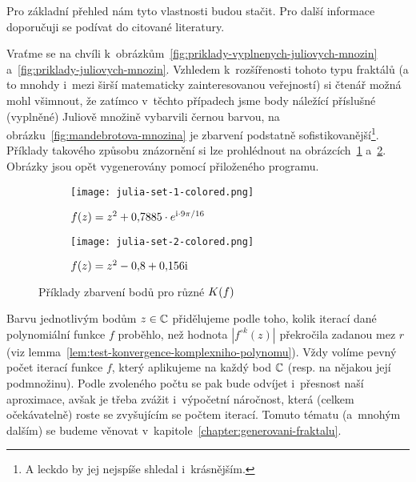 Pro základní přehled nám tyto vlastnosti budou stačit. Pro další informace doporučuji se podívat do citované literatury.

Vraťme se na chvíli k~obrázkům~\ref{fig:priklady-vyplnenych-juliovych-mnozin} a~\ref{fig:priklady-juliovych-mnozin}. Vzhledem k~rozšířenosti tohoto typu fraktálů (a to mnohdy i~mezi širší matematicky zainteresovanou veřejností) si čtenář možná mohl všimnout, že zatímco v~těchto případech jsme body náležící příslušné (vyplněné) Juliově množině vybarvili černou barvou, na obrázku~\ref{fig:mandebrotova-mnozina} je zbarvení podstatně sofistikovanější\footnote{A leckdo by jej nejspíše shledal i~krásnějším.}. Příklady takového způsobu znázornění si lze prohlédnout na obrázcích~\ref{subfig:vyplnena-juliova-mnozina-1-obarveno} a~\ref{subfig:vyplnena-juliova-mnozina-2-obarveno}. Obrázky jsou opět vygenerovány pomocí přiloženého programu.
\begin{figure}[h]
    \centering
    \begin{subfigure}{0.48\textwidth}
        \centering
        \texttt{[image: julia-set-1-colored.png]}
        \caption{$f(z)=z^2 + 0{,}7885\cdot e^{\textrm{i}\cdot9\pi/16}$}
        \label{subfig:vyplnena-juliova-mnozina-1-obarveno}
    \end{subfigure}
    \quad
    \begin{subfigure}{0.48\textwidth}
        \centering
        \texttt{[image: julia-set-2-colored.png]}
        \caption{$f(z)=z^2 - 0{,}8 + 0{,}156\textrm{i}$}
        \label{subfig:vyplnena-juliova-mnozina-2-obarveno}
    \end{subfigure}
    \caption{Příklady zbarvení bodů pro různé $K(f)$}
    \label{fig:priklady-vyplnenych-juliovych-mnozin-obarveno}
\end{figure}

Barvu jednotlivým bodům $z\in\mathbb{C}$ přidělujeme podle toho, kolik iterací dané polynomiální funkce $f$ proběhlo, než hodnota $|f^{\circ k}(z)|$ překročila zadanou mez $r$ (viz lemma~\ref{lem:test-konvergence-komplexniho-polynomu}). Vždy volíme pevný počet iterací funkce $f$, který aplikujeme na každý bod $\mathbb{C}$ (resp. na nějakou její podmnožinu). Podle zvoleného počtu se pak bude odvíjet i~přesnost naší aproximace, avšak je třeba zvážit i~výpočetní náročnost, která (celkem očekávatelně) roste se zvyšujícím se počtem iterací. Tomuto tématu (a~mnohým dalším) se budeme věnovat v~kapitole~\ref{chapter:generovani-fraktalu}.
 
